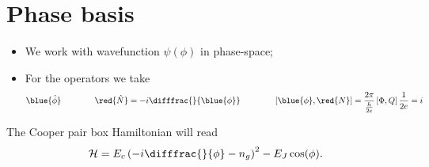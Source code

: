 \section{Phase basis}
 
 \begin{itemize}
 	\item We work with wavefunction $ \psi(\phi) $ in phase-space;
 	\item For the operators we take
 	\begin{equation}\label{key}
 		\blue{\hat{\phi}} \qquad \qquad \red{\hat{N}} = -i\difffrac{}{\blue{\phi}}\qquad\qquad \left[\blue{\phi},\red{N}\right] = \frac{2\pi}{\frac{h}{2e}}\left[\Phi,Q\right]\frac{1}{2e} = i\\
 	\end{equation}
 \end{itemize}

 The Cooper pair box Hamiltonian will read
 \begin{equation}\label{key}
 	\mathcal{H} = E_c\left(-i\difffrac{}{\phi} - n_g\right)^2 - E_J\cos(\phi).
 \end{equation}
\newpage 